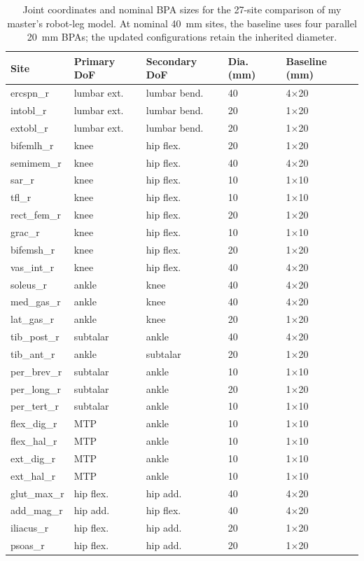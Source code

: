 \begin{table}[p]
\centering
\caption{Joint coordinates and nominal BPA sizes for the 27-site comparison of my master's robot-leg model. At nominal \qty{40}{\mm} sites, the baseline uses four parallel \qty{20}{\mm} BPAs; the updated configurations retain the inherited diameter.}
\label{tab:survey_dofs_sizes}
\begingroup\small\renewcommand{\arraystretch}{1.1}
\begin{tabular}{@{}lllll@{}}
\toprule
\textbf{Site} & \textbf{Primary DoF} & \textbf{Secondary DoF} & \textbf{Dia. (\unit{\mm})} & \textbf{Baseline (\unit{\mm})} \\
\midrule
ercspn\_r & lumbar ext. & lumbar bend. & 40 & 4$\times$20 \\
intobl\_r & lumbar ext. & lumbar bend. & 20 & 1$\times$20 \\
extobl\_r & lumbar ext. & lumbar bend. & 20 & 1$\times$20 \\
bifemlh\_r & knee & hip flex. & 20 & 1$\times$20 \\
semimem\_r & knee & hip flex. & 40 & 4$\times$20 \\
sar\_r & knee & hip flex. & 10 & 1$\times$10 \\
tfl\_r & knee & hip flex. & 10 & 1$\times$10 \\
rect\_fem\_r & knee & hip flex. & 20 & 1$\times$20 \\
grac\_r & knee & hip flex. & 10 & 1$\times$10 \\
bifemsh\_r & knee & hip flex. & 20 & 1$\times$20 \\
vas\_int\_r & knee & hip flex. & 40 & 4$\times$20 \\
soleus\_r & ankle & knee & 40 & 4$\times$20 \\
med\_gas\_r & ankle & knee & 40 & 4$\times$20 \\
lat\_gas\_r & ankle & knee & 20 & 1$\times$20 \\
tib\_post\_r & subtalar & ankle & 40 & 4$\times$20 \\
tib\_ant\_r & ankle & subtalar & 20 & 1$\times$20 \\
per\_brev\_r & subtalar & ankle & 10 & 1$\times$10 \\
per\_long\_r & subtalar & ankle & 20 & 1$\times$20 \\
per\_tert\_r & subtalar & ankle & 10 & 1$\times$10 \\
flex\_dig\_r & MTP & ankle & 10 & 1$\times$10 \\
flex\_hal\_r & MTP & ankle & 10 & 1$\times$10 \\
ext\_dig\_r & MTP & ankle & 10 & 1$\times$10 \\
ext\_hal\_r & MTP & ankle & 10 & 1$\times$10 \\
glut\_max\_r & hip flex. & hip add. & 40 & 4$\times$20 \\
add\_mag\_r & hip add. & hip flex. & 40 & 4$\times$20 \\
iliacus\_r & hip flex. & hip add. & 20 & 1$\times$20 \\
psoas\_r & hip flex. & hip add. & 20 & 1$\times$20 \\
\bottomrule
\end{tabular}
\endgroup
\end{table}


